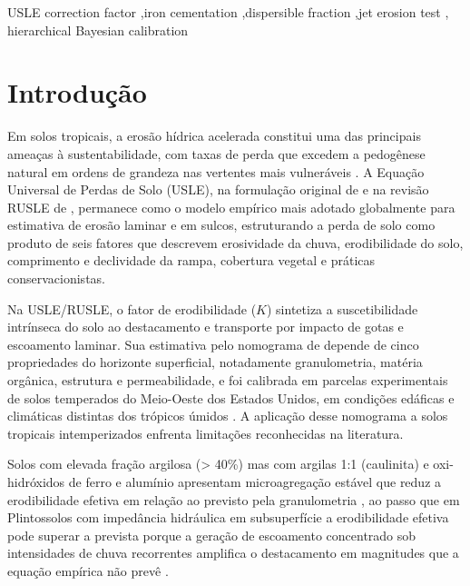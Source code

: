 \documentclass[
  brazilian,
  authoryear,
  preprint]{elsarticle}
\begin{document}
\begin{frontmatter}
\begin{keyword}
    USLE correction factor \sep iron cementation \sep dispersible
fraction \sep jet erosion test \sep 
    hierarchical Bayesian calibration
\end{keyword}
\end{frontmatter}
    

\section{Introdução}\label{introduuxe7uxe3o}

Em solos tropicais, a erosão hídrica acelerada constitui uma das
principais ameaças à sustentabilidade, com taxas de perda que excedem a
pedogênese natural em ordens de grandeza nas vertentes mais vulneráveis
\citep{poesen_2018}. A Equação Universal de Perdas de Solo (USLE), na
formulação original de \citet{wischmeier_smith_1978} e na revisão RUSLE
de \citet{renard_et_al_1997}, permanece como o modelo empírico mais
adotado globalmente para estimativa de erosão laminar e em sulcos,
estruturando a perda de solo como produto de seis fatores que descrevem
erosividade da chuva, erodibilidade do solo, comprimento e declividade
da rampa, cobertura vegetal e práticas conservacionistas.

Na USLE/RUSLE, o fator de erodibilidade (\(K\)) sintetiza a
suscetibilidade intrínseca do solo ao destacamento e transporte por
impacto de gotas e escoamento laminar. Sua estimativa pelo nomograma de
\citet{wischmeier_et_al_1971} depende de cinco propriedades do horizonte
superficial, notadamente granulometria, matéria orgânica, estrutura e
permeabilidade, e foi calibrada em parcelas experimentais de solos
temperados do Meio-Oeste dos Estados Unidos, em condições edáficas e
climáticas distintas dos trópicos úmidos \citep{alewell_et_al_2019}. A
aplicação desse nomograma a solos tropicais intemperizados enfrenta
limitações reconhecidas na literatura.

Solos com elevada fração argilosa (\textgreater{} 40\%) mas com argilas
1:1 (caulinita) e oxi-hidróxidos de ferro e alumínio apresentam
microagregação estável que reduz a erodibilidade efetiva em relação ao
previsto pela granulometria
\citep{silva_et_al_2009, bertoni_lombardi_neto_2017}, ao passo que em
Plintossolos com impedância hidráulica em subsuperfície a erodibilidade
efetiva pode superar a prevista porque a geração de escoamento
concentrado sob intensidades de chuva recorrentes amplifica o
destacamento em magnitudes que a equação empírica não prevê
\citep{poesen_2018, cassol_et_al_2023}.
\end{document}
